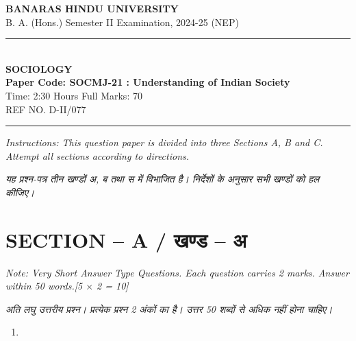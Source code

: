 \documentclass[11pt,a4paper]{article}
\newcommand{\pts}[1]{\hfill \textit{[#1]}}
\begin{document}
\begin{center}
  {\large\bfseries BANARAS HINDU UNIVERSITY}\\[2pt]
  {\normalsize B. A. (Hons.) Semester II Examination, 2024-25 (NEP)}\\[6pt]
  \rule{0.8\linewidth}{0.5pt}\\[6pt]
  {\large\bfseries SOCIOLOGY}\\[4pt]
  {\large\bfseries Paper Code: SOCMJ-21 : Understanding of Indian Society}\\[4pt]
  {\normalsize Time: 2:30 Hours \hfill Full Marks: 70}\\[2pt]
  {\small REF NO. D-II/077}
\end{center}
\rule{\linewidth}{0.4pt}
\smallskip

\noindent \textit{Instructions: This question paper is divided into three Sections A, B and C. Attempt all sections according to directions.}

\smallskip
\noindent \textit{यह प्रश्न-पत्र तीन खण्डों अ, ब तथा स में विभाजित है। निर्देशों के अनुसार सभी खण्डों को हल कीजिए।}

\bigskip

\section*{SECTION -- A / खण्ड -- अ}
\noindent \textit{Note: Very Short Answer Type Questions. Each question carries 2 marks. Answer within 50 words.}\pts{5 $\times$ 2 = 10}

\noindent \textit{अति लघु उत्तरीय प्रश्न। प्रत्येक प्रश्न 2 अंकों का है। उत्तर 50 शब्दों से अधिक नहीं होना चाहिए।}

\begin{enumerate}[label=\textbf{\arabic*.},leftmargin=*,itemsep=8pt]
  \item 
\end{enumerate}
\end{document}
